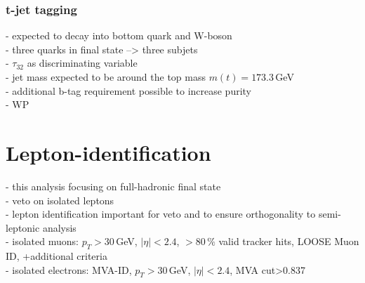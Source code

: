 \subsubsection{t-jet tagging}
- expected to decay into bottom quark and W-boson\\
- three quarks in final state --> three subjets\\
- $\tau_{32}$ as discriminating variable\\
- jet mass expected to be around the top mass $m(t)=173.3\,$GeV\\
- additional b-tag requirement possible to increase purity\\
- WP\\
\section{Lepton-identification}
- this analysis focusing on full-hadronic final state\\
- veto on isolated leptons\\
- lepton identification important for veto and to ensure orthogonality to semi-leptonic analysis\\
- isolated muons: $p_T>30\,$GeV, $|\eta|<2.4$, $>80\,\%$ valid tracker hits, LOOSE Muon ID, +additional criteria\\
- isolated electrons: MVA-ID, $p_T>30\,$GeV, $|\eta|<2.4$, MVA cut>0.837\\